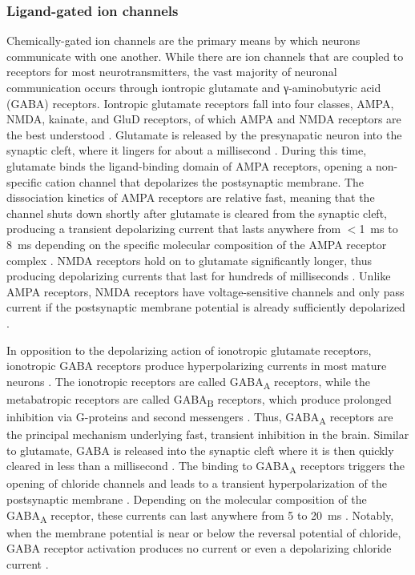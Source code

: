 \subsubsection{Ligand-gated ion channels} \label{sec:I_syn}
Chemically-gated ion channels are the primary means by which neurons communicate with one another. While there are ion channels that are coupled to receptors for most neurotransmitters, the vast majority of neuronal communication occurs through iontropic glutamate and γ-aminobutyric acid (GABA) receptors. Iontropic glutamate receptors fall into four classes, AMPA, NMDA, kainate, and GluD receptors, of which AMPA and NMDA receptors are the best understood \cite{Hansen2021}. Glutamate is released by the presynapatic neuron into the synaptic cleft, where it lingers for about a millisecond \cite{Clements1992}. During this time, glutamate binds the ligand-binding domain of AMPA receptors, opening a non-specific cation channel that depolarizes the postsynaptic membrane. The dissociation kinetics of AMPA receptors are relative fast, meaning that the channel shuts down shortly after glutamate is cleared from the synaptic cleft, producing a transient depolarizing current that lasts anywhere from $<$\qty{1}{\milli\second} to \qty{8}{\milli\second} depending on the specific molecular composition of the AMPA receptor complex \cite{Geiger1997,Howe2015,Greger2017}. NMDA receptors hold on to glutamate significantly longer, thus producing depolarizing currents that last for hundreds of milliseconds \cite{Lester1990}. Unlike AMPA receptors, NMDA receptors have voltage-sensitive channels and only pass current if the postsynaptic membrane potential is already sufficiently depolarized \cite{Mayer1984}. 

In opposition to the depolarizing action of ionotropic glutamate receptors, ionotropic GABA receptors produce hyperpolarizing currents in most mature neurons \cite{Farrant2005}. The ionotropic receptors are called GABA\textsubscript{A} receptors, while the metabatropic receptors are called GABA\textsubscript{B} receptors, which produce prolonged inhibition via G-proteins and second messengers \cite{Bettler2004}. Thus, GABA\textsubscript{A} receptors are the principal mechanism underlying fast, transient inhibition in the brain. Similar to glutamate, GABA is released into the synaptic cleft where it is then quickly cleared in less than a millisecond \cite{Mozrzymas2003}. The binding to GABA\textsubscript{A} receptors triggers the opening of chloride channels and leads to a transient hyperpolarization of the postsynaptic membrane \cite{Farrant2005}. Depending on the molecular composition of the GABA\textsubscript{A} receptor, these currents can last anywhere from 5 to \qty{20}{\milli\second} \cite{Farrant2005,Bacci2003}. Notably, when the membrane potential is near or below the reversal potential of chloride, GABA receptor activation produces no current or even a depolarizing chloride current \cite{Alger1979,Andersen1980}.

